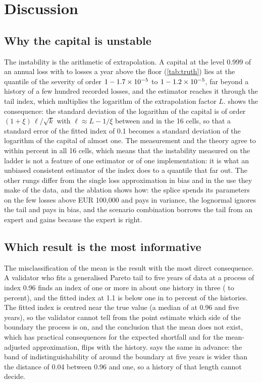 \section{Discussion}
\label{sec:discussion}

\subsection{Why the capital is unstable}
\label{sec:disc-why}

The instability is the arithmetic of extrapolation. A capital at the level 0.999 of an annual loss with \lamMin{} to \lamMax{} losses a year above the floor (\cref{tab:truth}) lies at the quantile of the severity of order $1-1.7\times10^{-5}$ to $1-1.2\times10^{-5}$, far beyond a history of a few hundred recorded losses, and the estimator reaches it through the tail index, which multiplies the logarithm of the extrapolation factor $L$.
 shows the consequence: the standard deviation of the logarithm of the capital is of order $(1+\xi)\,\ell/\sqrt k$ with $\ell\approx L-1/\xi$ between \ellMin{} and \ellMax{} in the 16 cells, so that a standard error of the fitted index of 0.1 becomes a standard deviation of the logarithm of the capital of almost one. The measurement and the theory agree to within \thSdMaxErr{} percent in all 16 cells, which means that the instability measured on the ladder is not a feature of one estimator or of one implementation: it is what an unbiased consistent estimator of the index does to a quantile that far out.
The other rungs differ from the single loss approximation in bias and in the use they make of the data, and the ablation shows how: the splice spends its parameters on the few losses above EUR 100,000 and pays in variance, the lognormal ignores the tail and pays in bias, and the scenario combination borrows the tail from an expert and gains because the expert is right.

\subsection{Which result is the most informative}
\label{sec:disc-informative}

The misclassification of the mean is the result with the most direct consequence. A validator who fits a generalised Pareto tail to five years of data at a process of index 0.96 finds an index of one or more in about one history in three (\infLo{} to \infHi{} percent), and the fitted index at 1.1 is below one in \finLo{} to \finHi{} percent of the histories. The fitted index is centred near the true value (a median of \cXiCFaMed{} at 0.96 and five years), so the validator cannot tell from the point estimate which side of the boundary the process is on, and the conclusion that the mean does not exist, which has practical consequences for the expected shortfall and for the mean-adjusted approximation, flips with the history.
 says the same in advance: the band of indistinguishability of \exBandC{} around the boundary at five years is wider than the distance of 0.04 between 0.96 and one, so a history of that length cannot decide.

